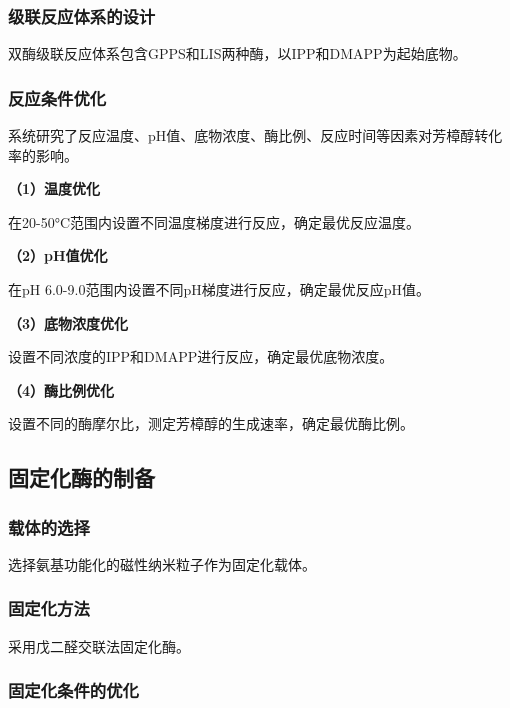 \subsubsection{级联反应体系的设计}


双酶级联反应体系包含GPPS和LIS两种酶，以IPP和DMAPP为起始底物。

\subsubsection{反应条件优化}


系统研究了反应温度、pH值、底物浓度、酶比例、反应时间等因素对芳樟醇转化率的影响。

\textbf{（1）温度优化}

在20-50°C范围内设置不同温度梯度进行反应，确定最优反应温度。

\textbf{（2）pH值优化}

在pH 6.0-9.0范围内设置不同pH梯度进行反应，确定最优反应pH值。

\textbf{（3）底物浓度优化}

设置不同浓度的IPP和DMAPP进行反应，确定最优底物浓度。

\textbf{（4）酶比例优化}

设置不同的酶摩尔比，测定芳樟醇的生成速率，确定最优酶比例。

\subsection{固定化酶的制备}

\subsubsection{载体的选择}


选择氨基功能化的磁性纳米粒子作为固定化载体。

\subsubsection{固定化方法}


采用戊二醛交联法固定化酶。

\subsubsection{固定化条件的优化}

